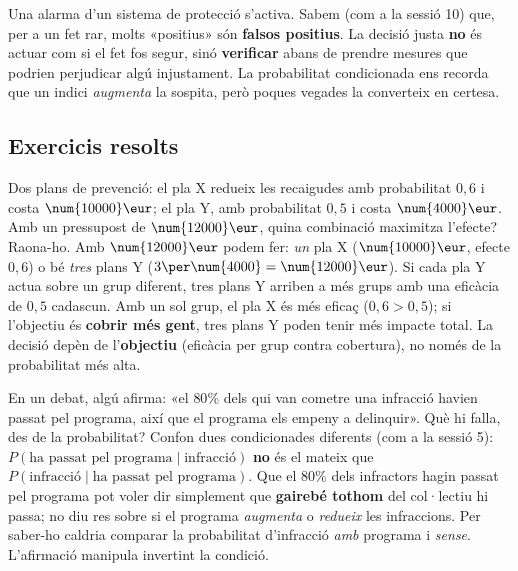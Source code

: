 \begin{exemple}
Una alarma d'un sistema de protecció s'activa. Sabem (com a la sessió 10) que, per a un
fet rar, molts «positius» són \textbf{falsos positius}. La decisió justa \textbf{no} és
actuar com si el fet fos segur, sinó \textbf{verificar} abans de prendre mesures que
podrien perjudicar algú injustament. La probabilitat condicionada ens recorda que un
indici \emph{augmenta} la sospita, però poques vegades la converteix en certesa.
\end{exemple}

\subsection{Exercicis resolts}

\begin{exresolt}
Dos plans de prevenció: el pla X redueix les recaigudes amb probabilitat $0,6$ i costa
$\num{10000}\eur$; el pla Y, amb probabilitat $0,5$ i costa $\num{4000}\eur$. Amb un
pressupost de $\num{12000}\eur$, quina combinació maximitza l'efecte? Raona-ho.
\solucio
Amb $\num{12000}\eur$ podem fer: \emph{un} pla X ($\num{10000}\eur$, efecte $0,6$) o bé
\emph{tres} plans Y ($3\per\num{4000}=\num{12000}\eur$). Si cada pla Y actua sobre un
grup diferent, tres plans Y arriben a més grups amb una eficàcia de $0,5$ cadascun. Amb
un sol grup, el pla X és més eficaç ($0,6>0,5$); si l'objectiu és \textbf{cobrir més
gent}, tres plans Y poden tenir més impacte total. La decisió depèn de l'\textbf{objectiu}
(eficàcia per grup contra cobertura), no només de la probabilitat més alta.
\end{exresolt}

\begin{exresolt}
En un debat, algú afirma: «el $80\%$ dels qui van cometre una infracció havien passat
pel programa, així que el programa els empeny a delinquir». Què hi falla, des de la
probabilitat?
\solucio
Confon dues condicionades diferents (com a la sessió 5):
$P(\text{ha passat pel programa}\mid\text{infracció})$ \textbf{no} és el mateix que
$P(\text{infracció}\mid\text{ha passat pel programa})$. Que el $80\%$ dels infractors
hagin passat pel programa pot voler dir simplement que \textbf{gairebé tothom} del
col·lectiu hi passa; no diu res sobre si el programa \emph{augmenta} o \emph{redueix} les
infraccions. Per saber-ho caldria comparar la probabilitat d'infracció \emph{amb}
programa i \emph{sense}. L'afirmació manipula invertint la condició.
\end{exresolt}

